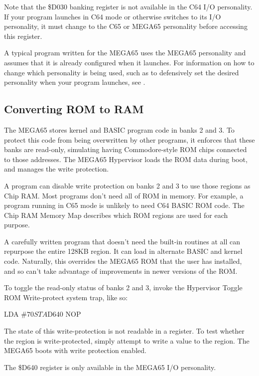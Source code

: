 Note that the \$D030 banking register is not available in the C64 I/O
personality. If your program launches in C64 mode or otherwise switches to its
I/O personality, it must change to the C65 or MEGA65 personality before
accessing this register.

A typical program written for the MEGA65 uses the MEGA65 personality and
assumes that it is already configured when it launches. For information on how
to change which personality is being used, such as to defensively set the
desired personality when your program launches, see .

\subsection{Converting ROM to RAM}

The MEGA65 stores kernel and BASIC program code in banks 2 and 3. To protect
this code from being overwritten by other programs, it enforces that these
banks are read-only, simulating having Commodore-style ROM chips connected to
those addresses. The MEGA65 Hypervisor loads the ROM data during boot, and
manages the write protection.

A program can disable write protection on banks 2 and 3 to use those regions
as Chip RAM. Most programs don't need all of ROM in memory. For example, a
program running in C65 mode is unlikely to need C64 BASIC ROM code. The Chip
RAM Memory Map describes which ROM regions are used for each purpose.

A carefully written program that doesn't need the built-in routines at all can
repurpose the entire 128KB region. It can load in alternate BASIC and kernel
code. Naturally, this overrides the MEGA65 ROM that the user has installed, and
so can't take advantage of improvements in newer versions of the ROM.

To toggle the read-only status of banks 2 and 3, invoke the Hypervisor Toggle
ROM Write-protect system trap, like so:

\begin{screenoutput}
LDA #$70
STA $D640
NOP
\end{screenoutput}

The state of this write-protection is not readable in a register. To test
whether the region is write-protected, simply attempt to write a value to the
region. The MEGA65 boots with write protection enabled.

The \$D640 register is only available in the MEGA65 I/O personality.

